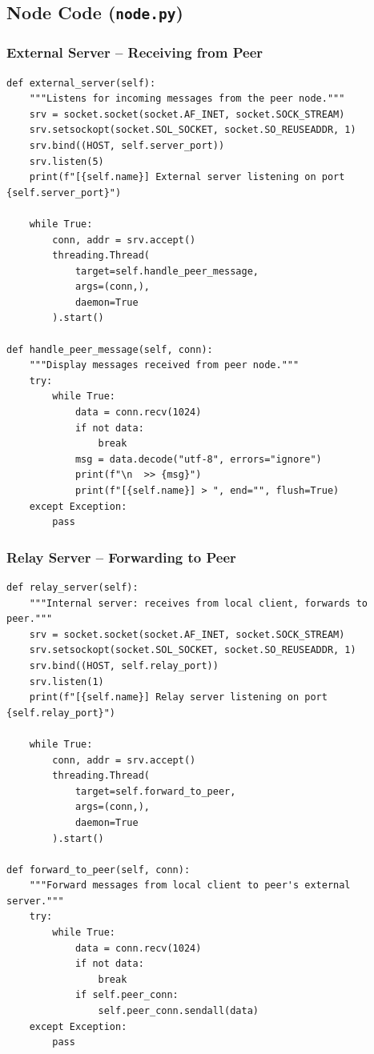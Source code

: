 \documentclass[11pt]{article}
\begin{document}
\subsection{Node Code (\texttt{node.py})}

\subsubsection{External Server -- Receiving from Peer}
\begin{lstlisting}
def external_server(self):
    """Listens for incoming messages from the peer node."""
    srv = socket.socket(socket.AF_INET, socket.SOCK_STREAM)
    srv.setsockopt(socket.SOL_SOCKET, socket.SO_REUSEADDR, 1)
    srv.bind((HOST, self.server_port))
    srv.listen(5)
    print(f"[{self.name}] External server listening on port {self.server_port}")

    while True:
        conn, addr = srv.accept()
        threading.Thread(
            target=self.handle_peer_message,
            args=(conn,),
            daemon=True
        ).start()

def handle_peer_message(self, conn):
    """Display messages received from peer node."""
    try:
        while True:
            data = conn.recv(1024)
            if not data:
                break
            msg = data.decode("utf-8", errors="ignore")
            print(f"\n  >> {msg}")
            print(f"[{self.name}] > ", end="", flush=True)
    except Exception:
        pass
\end{lstlisting}

\newpage

\subsubsection{Relay Server -- Forwarding to Peer}
\begin{lstlisting}
def relay_server(self):
    """Internal server: receives from local client, forwards to peer."""
    srv = socket.socket(socket.AF_INET, socket.SOCK_STREAM)
    srv.setsockopt(socket.SOL_SOCKET, socket.SO_REUSEADDR, 1)
    srv.bind((HOST, self.relay_port))
    srv.listen(1)
    print(f"[{self.name}] Relay server listening on port {self.relay_port}")

    while True:
        conn, addr = srv.accept()
        threading.Thread(
            target=self.forward_to_peer,
            args=(conn,),
            daemon=True
        ).start()

def forward_to_peer(self, conn):
    """Forward messages from local client to peer's external server."""
    try:
        while True:
            data = conn.recv(1024)
            if not data:
                break
            if self.peer_conn:
                self.peer_conn.sendall(data)
    except Exception:
        pass
\end{lstlisting}
\end{document}
